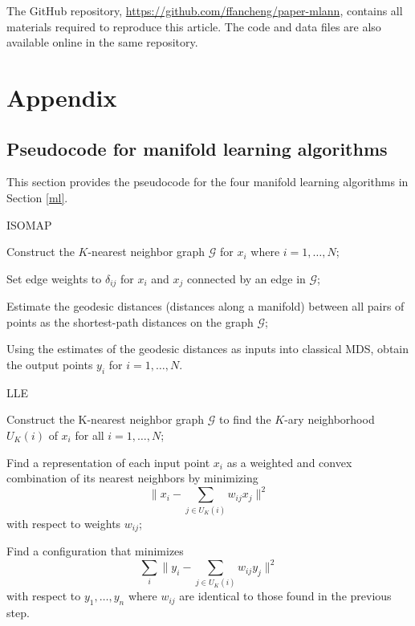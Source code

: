 \documentclass[11pt,a4paper,]{article}
\begin{document}
The GitHub repository, \url{https://github.com/ffancheng/paper-mlann}, contains all materials required to reproduce this article. The code and data files are also available online in the same repository.

\clearpage

\printbibliography

\clearpage\appendix
\section{Appendix}
\def\thepage{A\arabic{page}}

\subsection{Pseudocode for manifold learning algorithms}
\label{sec:mlalg}
This section provides the pseudocode for the four manifold learning algorithms in Section \ref{ml}.

\begin{algorithm}[!htb]
  \caption{ISOMAP}
  \label{alg:isomap}
  \DontPrintSemicolon
  \SetAlgoLined
  \BlankLine

  Construct the $K$-nearest neighbor graph $\mathcal{G}$ for $x_i$ where $i=1,\ldots,N$;

  Set edge weights to $\delta_{ij}$ for $x_i$ and $x_j$ connected by an edge in $\mathcal{G}$;

  Estimate the geodesic distances (distances along a manifold) between all pairs of points as the shortest-path distances on the graph $\mathcal{G}$;

  Using the estimates of the geodesic distances as inputs into classical MDS, obtain the output points $y_i$ for $i=1,\ldots,N$.

\end{algorithm}


\begin{algorithm}[!htb]
  \caption{LLE}
  \label{alg:lle}
  \DontPrintSemicolon
  \SetAlgoLined
  \BlankLine

  Construct the K-nearest neighbor graph $\mathcal{G}$ to find the $K$-ary neighborhood $U_K(i)$ of $x_i$ for all $i=1,\ldots,N$;

  Find a representation of each input point $x_i$ as a weighted and convex combination of its nearest neighbors by minimizing
  $$
    \bigg\|x_{i}-\sum_{j \in U_K(i)} w_{i j} x_{j}\bigg\|^{2}
  $$
  with respect to weights $w_{ij}$;

  Find a configuration that minimizes
  $$
    \sum_{i}\bigg\|y_{i}-\sum_{j \in U_K(i)} w_{i j} y_{j}\bigg\|^{2}
  $$
  with respect to $y_{1}, \dots, y_{n}$ where $w_{ij}$ are identical to those found in the previous step.

\end{algorithm}
\end{document}
